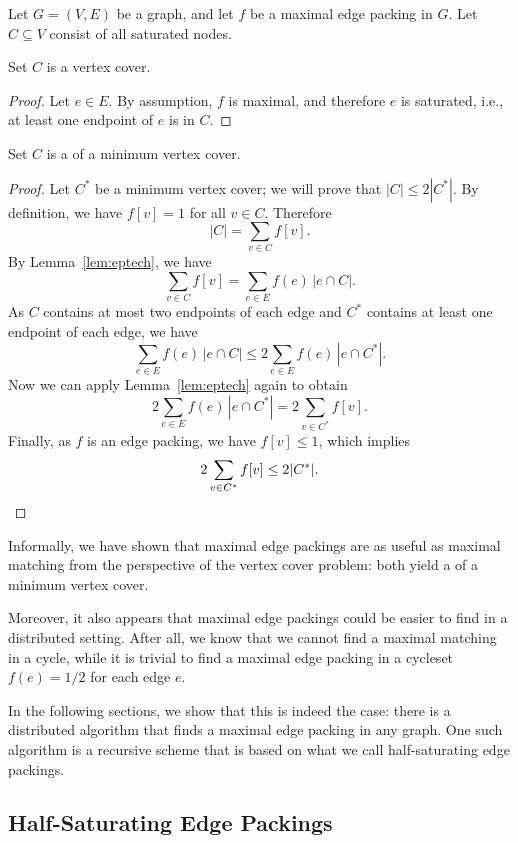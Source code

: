 Let $G = (V,E)$ be a graph, and let $f$ be a maximal edge packing in $G$. Let $C \subseteq V$ consist of all saturated nodes.

\begin{lemma}
    Set $C$ is a vertex cover.
\end{lemma}
\begin{proof}
    Let $e \in E$. By assumption, $f$ is maximal, and therefore $e$ is saturated, i.e., at least one endpoint of $e$ is in $C$.
\end{proof}

\begin{lemma}\label{lem:mep-vc}
    Set $C$ is a  of a minimum vertex cover.
\end{lemma}
\begin{proof}
    Let $C^*$ be a minimum vertex cover; we will prove that $|C| \le 2|C^*|$. By definition, we have $f[v] = 1$ for all $v \in C$. Therefore
    \[
        |C| = \sum_{v \in C} f[v].
    \]
    By Lemma~\ref{lem:eptech}, we have
    \[
        \sum_{v \in C} f[v] = \sum_{e \in E} f(e) \, |e \cap C|.
    \]
    As $C$ contains at most two endpoints of each edge and $C^*$ contains at least one endpoint of each edge, we have
    \[
        \sum_{e \in E} f(e) \, |e \cap C| \le 2 \sum_{e \in E} f(e) \, |e \cap C^*|.
    \]
    Now we can apply Lemma~\ref{lem:eptech} again to obtain
    \[
        2 \sum_{e \in E} f(e) \, |e \cap C^*| = 2 \sum_{v \in C^*} f[v].
    \]
    Finally, as $f$ is an edge packing, we have $f[v] \le 1$, which implies
    \[
        2 \sum_{v \in C^*} f[v] \le 2 |C^*|. \qedhere
    \]
\end{proof}

Informally, we have shown that maximal edge packings are as useful as maximal matching from the perspective of the vertex cover problem: both yield a  of a minimum vertex cover.

Moreover, it also appears that maximal edge packings could be easier to find in a distributed setting. After all, we know that we cannot find a maximal matching in a cycle, while it is trivial to find a maximal edge packing in a cycle\mydash set $f(e) = 1/2$ for each edge $e$.

In the following sections, we show that this is indeed the case: there is a distributed algorithm that finds a maximal edge packing in any graph. One such algorithm is a recursive scheme that is based on what we call half-saturating edge packings.


\subsection{Half-Saturating Edge Packings}\label{ssec:hsep-def}

